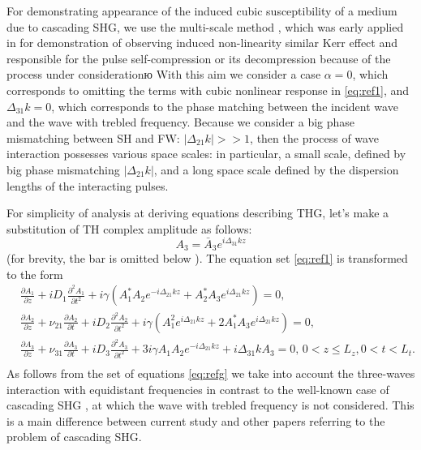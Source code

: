 \documentclass[a4paper, 12pt, onecolumn]{extarticle}
\begin{document}
For demonstrating  appearance of the  induced cubic susceptibility of a medium due to cascading SHG, we use the multi-scale method \cite{bib:n24}, which was early applied in \cite{bib:n19} for demonstration of observing induced non-linearity similar Kerr effect and responsible for the pulse self-compression or its decompression  because of the  process under considerationю
With this aim we consider a case \(\alpha=0\), which corresponds to omitting the terms with cubic nonlinear response in \eqref{eq:ref1},  and \(\Delta_{31}k=0\), which corresponds to the phase matching between the incident wave and the wave with trebled frequency. Because we consider a big phase mismatching between SH and FW: \(|\Delta_{21}k|>>1\), then the process of wave interaction possesses various space scales: in particular, a small scale, defined by big phase mismatching \(|\Delta_{21}k|\), and a long space scale defined by the dispersion lengths of the interacting pulses. 

For simplicity of  analysis at deriving equations describing THG, let's make a substitution of TH complex amplitude as follows:
$$
{A}_3=\bar{A}_3e^{i\Delta_{31}kz}
$$
(for brevity, the bar is omitted below ). The equation set \eqref{eq:ref1} is transformed to the form
\begin{equation}
\label{eq:refg}
\begin{aligned}
&\frac{\partial{A_1}}{\partial{z}}+iD_1\frac{\partial^2{A_1}}{\partial{t^2}}+i\gamma\left(A_1^* A_2e^{-i\Delta_{21} kz}+A_2^* A_3e^{i\Delta_{21}kz}\right)=0,\\
&\frac{\partial{A_2}}{\partial{z}}+\nu_{21}\frac{\partial A_2}{\partial t}+iD_2\frac{\partial^2{A_2}}{\partial{t^2}}+i\gamma\left(A_1^2e^{i\Delta_{21} kz}+2A_1^*A_3e^{i\Delta_{21}kz}\right)=0,\\
&\frac{\partial{A_3}}{\partial{z}}+\nu_{31}\frac{\partial A_3}{\partial t}+iD_3\frac{\partial^2{A_3}}{\partial{t^2}}+3i\gamma A_1 A_2e^{-i\Delta_{21}kz}+i\Delta_{31}kA_3=0,\,0< z \leq L_z , 0<t<L_t.\\
\end{aligned}\end{equation}
As follows from the set of equations \eqref{eq:refg} we take into account the three-waves interaction with equidistant frequencies in contrast to the well-known case of cascading SHG , at which the wave with trebled frequency is not considered. This is a main difference between current study and other papers referring to the problem of cascading SHG.
\end{document}
